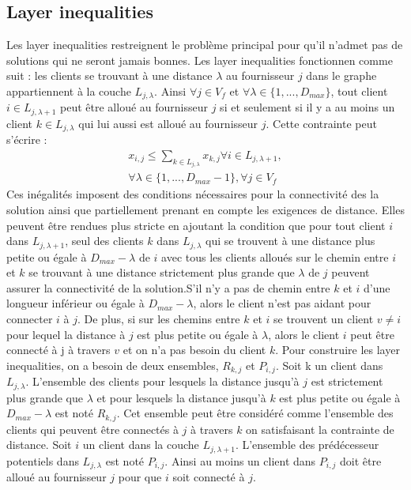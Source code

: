 \documentclass[letterpaper]{article}
\begin{document}
\subsection{Layer inequalities}
Les layer inequalities restreignent le problème principal pour qu'il n'admet pas de solutions qui ne seront jamais bonnes. Les layer inequalities fonctionnen comme suit : les clients se trouvant à une distance $\lambda$ au fournisseur $j$ dans le graphe appartiennent à la couche $L_{j,\lambda}$. Ainsi $\forall j \in V_{f}$ et $\forall \lambda \in \{1,...,D_{max} \}$, tout client $i \in L_{j,\lambda + 1}$ peut être alloué au fournisseur $j$ si et seulement si il y a au moins un client $k \in L_{j,\lambda}$ qui lui aussi est alloué au fournisseur $j$. Cette contrainte peut s'écrire : 
\begin{align*}
x_{i,j} \leq \sum_{k \in L_{j,\lambda} }{x_{k,j}} \forall i \in L_{j,\lambda +1},\\ \forall \lambda \in \{ 1,...,D_{max}-1 \}, \forall j \in V_{f}
\end{align*}
Ces inégalités imposent des conditions nécessaires pour la connectivité des la solution ainsi que partiellement prenant en compte les exigences de distance. Elles peuvent être rendues plus stricte en ajoutant la condition que pour tout client $i$ dans $L_{j,\lambda +1}$, seul des clients $k$ dans $L_{j,\lambda}$ qui se trouvent à une distance plus petite ou égale à $D_{max}-\lambda$ de $i$ avec tous les clients alloués sur le chemin entre $i$ et $k$ se trouvant à une distance strictement plus grande que $\lambda$ de $j$ peuvent assurer la connectivité de la solution.S'il n'y a pas de chemin entre $k$ et $i$ d'une longueur inférieur ou égale à $D_{max}-\lambda$, alors le client n'est pas aidant pour connecter $i$ à $j$. De plus, si sur les chemins entre $k$ et $i$ se trouvent un client $v \neq i$ pour lequel la distance à $j$ est plus petite ou égale à $\lambda$, alors le client $i$ peut être connecté à j à travers $v$ et on n'a pas besoin du client $k$.\newline \indent
Pour construire les layer inequalities, on a besoin de deux ensembles, $R_{k,j}$ et $P_{i,j}$. Soit k un client dans $L_{j,\lambda}$. L'ensemble des clients pour lesquels la distance jusqu'à $j$ est strictement plus grande que $\lambda$ et pour lesquels la distance jusqu'à $k$ est plus petite ou égale à $D_{max}-\lambda$ est noté $R_{k,j}$. Cet ensemble peut être considéré comme l'ensemble des clients qui peuvent être connectés à $j$ à travers $k$ on satisfaisant la contrainte de distance. Soit $i$ un client dans la couche $L_{j,\lambda +1}$. L'ensemble des prédécesseur potentiels dans $L_{j,\lambda}$ est noté $P_{i,j}$. Ainsi au moins un client dans $P_{i,j}$ doit être alloué au fournisseur $j$ pour que $i$ soit connecté à $j$.\newline\indent
\end{document}
